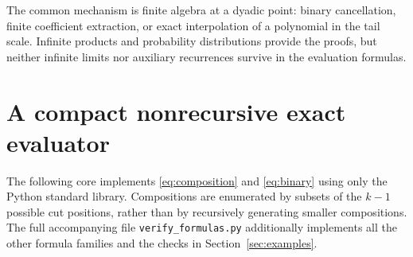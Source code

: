 \documentclass[11pt,a4paper]{article}
\theoremstyle{definition}
\theoremstyle{remark}
\begin{document}
The common mechanism is finite algebra at a dyadic point: binary cancellation,
finite coefficient extraction, or exact interpolation of a polynomial in the tail
scale.  Infinite products and probability distributions provide the proofs, but
neither infinite limits nor auxiliary recurrences survive in the evaluation
formulas.

\appendix
\section{A compact nonrecursive exact evaluator}
\label{app:code}
The following core implements \eqref{eq:composition} and \eqref{eq:binary} using
only the Python standard library.  Compositions are enumerated by subsets of the
\(k-1\) possible cut positions, rather than by recursively generating smaller
compositions.  The full accompanying file \texttt{verify\_formulas.py} additionally
implements all the other formula families and the checks in
Section~\ref{sec:examples}.
\end{document}

